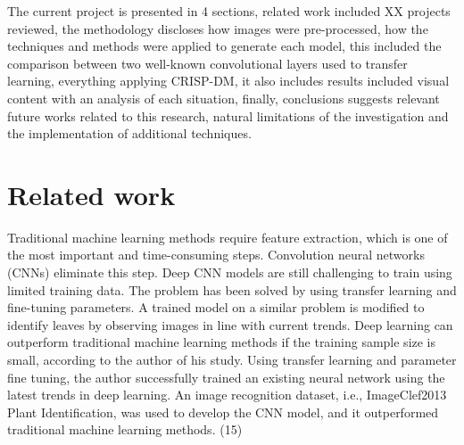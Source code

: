 \documentclass[conference]{IEEEtran}
\begin{document}
The current project is presented in 4 sections, related work included XX projects reviewed, the methodology discloses how images were pre-processed, how the techniques and methods were applied to generate each model, this included the comparison between two well-known convolutional layers used to transfer learning, everything applying CRISP-DM, it also includes  results included visual content with an analysis of each situation, finally, conclusions suggests relevant future works related to this research, natural limitations of the investigation and the implementation of additional techniques.  

\section{Related work}
Traditional machine learning methods require feature extraction, which is one of the most important and time-consuming steps. Convolution neural networks (CNNs) eliminate this step. Deep CNN models are still challenging to train using limited training data. The problem has been solved by using transfer learning and fine-tuning parameters. A trained model on a similar problem is modified to identify leaves by observing images in line with current trends. Deep learning can outperform traditional machine learning methods if the training sample size is small, according to the author of his study. Using transfer learning and parameter fine tuning, the author successfully trained an existing neural network using the latest trends in deep learning. An image recognition dataset, i.e., ImageClef2013 Plant Identification, was used to develop the CNN model, and it outperformed traditional machine learning methods. (15) 
\end{document}
